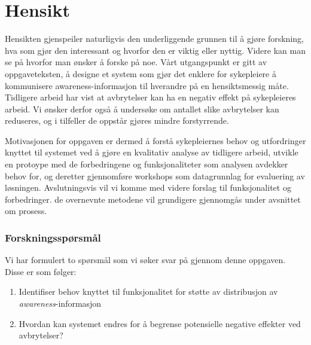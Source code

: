 \section{Hensikt}
\label{chp: hensikt}

Hensikten gjenspeiler naturligvis den underliggende grunnen til å gjøre forskning, hva som gjør den interessant og hvorfor den er viktig eller nyttig. Videre kan man se på hvorfor man ønsker å forske på noe. Vårt utgangspunkt er gitt av oppgaveteksten, å designe et system som gjør det enklere for sykepleiere å kommunisere awareness-informasjon til hverandre på en hensiktsmessig måte. Tidligere arbeid har vist at avbrytelser kan ha en negativ effekt på sykepleieres arbeid. Vi ønsker derfor også å undersøke om antallet slike avbrytelser kan reduseres, og i tilfeller de oppstår gjøres mindre forstyrrende. 

\noindent
Motivasjonen for oppgaven er dermed å forstå sykepleiernes behov og utfordringer knyttet til systemet ved å gjøre en kvalitativ analyse av tidligere arbeid, utvikle en protoype med de forbedringene og funksjonaliteter som analysen avdekker behov for, og deretter gjennomføre workshops som datagrunnlag for evaluering av løsningen. Avslutningsvis vil vi komme med videre forslag til funksjonalitet og forbedringer. de overnevnte metodene vil grundigere gjennomgås under avsnittet om prosess. 

\subsubsection{Forskningsspørsmål}
Vi har formulert to spørsmål som vi søker svar på gjennom denne oppgaven. Disse er som følger:

\begin{enumerate}
\item Identifiser behov knyttet til funksjonalitet for støtte av distribusjon av \emph{awareness}-informasjon
\item Hvordan kan systemet endres for å begrense potensielle negative effekter ved avbrytelser?
\end{enumerate}
